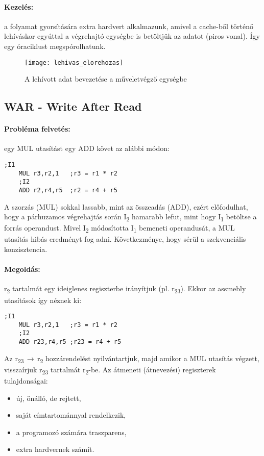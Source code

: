 \paragraph{Kezelés:} a folyamat gyorsítására extra hardvert alkalmazunk, amivel a cache-ből történő lehíváskor egyúttal a végrehajtó egységbe is betöltjük az adatot (piros vonal).
Így egy óraciklust megspórolhatunk.

\begin{figure}[H]
    \texttt{[image: lehivas\_elorehozas]}
    \centering
    \caption{A lehívott adat bevezetése a műveletvégző egységbe}
    \label{fig:lehivas_elorehozas}
\end{figure}

\subsection{WAR - Write After Read} \label{war}

\paragraph{Probléma felvetés:} egy MUL utasítást egy ADD követ az alábbi módon:
\begin{lstlisting}[language=Ant]
    ;I1
    MUL r3,r2,1   ;r3 = r1 * r2
    ;I2
    ADD r2,r4,r5  ;r2 = r4 + r5
\end{lstlisting}
A szorzás (MUL) sokkal lassabb, mint az összeadás (ADD), ezért előfodulhat, hogy a párhuzamos
végrehajtás során I\textsubscript{2} hamarabb lefut, mint hogy I\textsubscript{1} betöltse a forrás operandust.
Mivel I\textsubscript{2} módosította I\textsubscript{1} bemeneti operandusát, a MUL utasítás hibás eredményt fog adni.
Következménye, hogy sérül a szekvenciális konzisztencia.
\paragraph{Megoldás:} r\textsubscript{2} tartalmát egy ideiglenes regiszterbe irányítjuk (pl. r\textsubscript{23}).
Ekkor az assmebly utasítások így néznek ki:
\begin{lstlisting}[language=Ant]
    ;I1
    MUL r3,r2,1   ;r3 = r1 * r2
    ;I2
    ADD r23,r4,r5 ;r23 = r4 + r5
\end{lstlisting}
Az r\textsubscript{23}$\,\to\,$r\textsubscript{2} hozzárendelést nyilvántartjuk, majd amikor a MUL utasítás végzett, visszaírjuk r\textsubscript{23} tartalmát r\textsubscript{2}-be.
Az átmeneti (átnevezési) regiszterek tulajdonságai:
\begin{itemize}
    \item új, önálló, de rejtett,
    \item saját címtartománnyal rendelkezik,
    \item a programozó számára traszparens,
    \item extra hardvernek számít.
\end{itemize}


